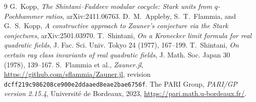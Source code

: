 \documentclass[11pt]{article}
\begin{document}
\begin{thebibliography}{9}
G.~Kopp, \emph{The Shintani--Faddeev modular cocycle: Stark units from
$q$-Pochhammer ratios}, arXiv:2411.06763.
D.~M.~Appleby, S.~T.~Flammia, and G.~S.~Kopp,
\emph{A constructive approach to Zauner's conjecture via the Stark
conjectures}, arXiv:2501.03970.
T.~Shintani, \emph{On a Kronecker limit formula for real quadratic
fields}, J. Fac. Sci. Univ. Tokyo 24 (1977), 167--199.
T.~Shintani, \emph{On certain ray class invariants of real quadratic
fields}, J. Math. Soc. Japan 30 (1978), 139--167.
S.~Flammia et al., \emph{Zauner.jl},
\url{https://github.com/sflammia/Zauner.jl},
revision \texttt{dcff219c986208ce900e2ddaaed8eae2bae6756f}.
The PARI Group, \emph{PARI/GP version 2.15.4},
Université de Bordeaux, 2023,
\url{https://pari.math.u-bordeaux.fr/}.
\end{thebibliography}
\end{document}
